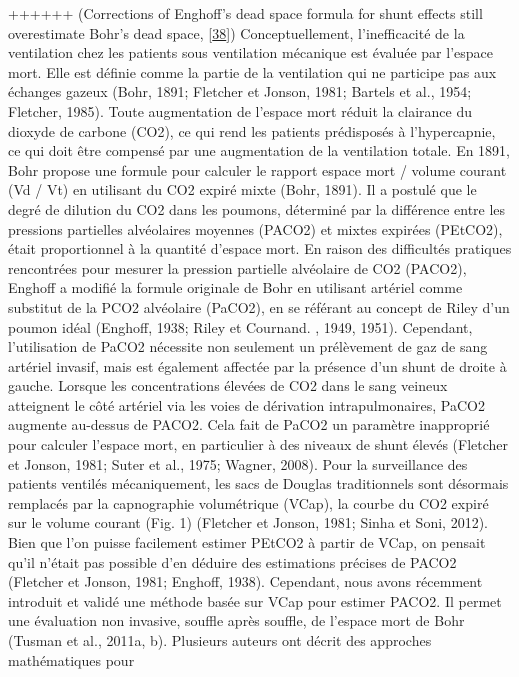 \documentclass[12pt,]{article}
\begin{document}
++++++ (Corrections of Enghoff's dead space formula for shunt effects
still overestimate Bohr's dead space,
{[}\protect\hyperlink{ref-suarez2013corrections}{38}{]})
Conceptuellement, l'inefficacité de la ventilation chez les patients
sous ventilation mécanique est évaluée par l'espace mort. Elle est
définie comme la partie de la ventilation qui ne participe pas aux
échanges gazeux (Bohr, 1891; Fletcher et Jonson, 1981; Bartels et al.,
1954; Fletcher, 1985). Toute augmentation de l'espace mort réduit la
clairance du dioxyde de carbone (CO2), ce qui rend les patients
prédisposés à l'hypercapnie, ce qui doit être compensé par une
augmentation de la ventilation totale. En 1891, Bohr propose une formule
pour calculer le rapport espace mort / volume courant (Vd / Vt) en
utilisant du CO2 expiré mixte (Bohr, 1891). Il a postulé que le degré de
dilution du CO2 dans les poumons, déterminé par la différence entre les
pressions partielles alvéolaires moyennes (PACO2) et mixtes expirées
(PEtCO2), était proportionnel à la quantité d'espace mort. En raison des
difficultés pratiques rencontrées pour mesurer la pression partielle
alvéolaire de CO2 (PACO2), Enghoff a modifié la formule originale de
Bohr en utilisant artériel comme substitut de la PCO2 alvéolaire
(PaCO2), en se référant au concept de Riley d'un poumon idéal (Enghoff,
1938; Riley et Cournand. , 1949, 1951). Cependant, l'utilisation de
PaCO2 nécessite non seulement un prélèvement de gaz de sang artériel
invasif, mais est également affectée par la présence d'un shunt de
droite à gauche. Lorsque les concentrations élevées de CO2 dans le sang
veineux atteignent le côté artériel via les voies de dérivation
intrapulmonaires, PaCO2 augmente au-dessus de PACO2. Cela fait de PaCO2
un paramètre inapproprié pour calculer l'espace mort, en particulier à
des niveaux de shunt élevés (Fletcher et Jonson, 1981; Suter et al.,
1975; Wagner, 2008). Pour la surveillance des patients ventilés
mécaniquement, les sacs de Douglas traditionnels sont désormais
remplacés par la capnographie volumétrique (VCap), la courbe du CO2
expiré sur le volume courant (Fig. 1) (Fletcher et Jonson, 1981; Sinha
et Soni, 2012). Bien que l'on puisse facilement estimer PEtCO2 à partir
de VCap, on pensait qu'il n'était pas possible d'en déduire des
estimations précises de PACO2 (Fletcher et Jonson, 1981; Enghoff, 1938).
Cependant, nous avons récemment introduit et validé une méthode basée
sur VCap pour estimer PACO2. Il permet une évaluation non invasive,
souffle après souffle, de l'espace mort de Bohr (Tusman et al., 2011a,
b). Plusieurs auteurs ont décrit des approches mathématiques pour
\end{document}
